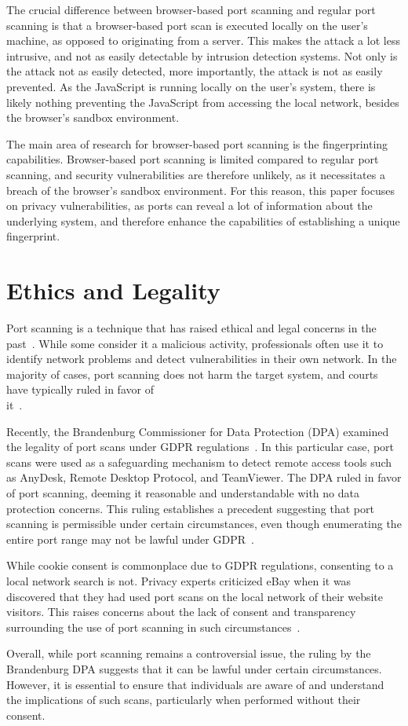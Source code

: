 The crucial difference between browser-based port scanning and regular port scanning is that a browser-based port scan is executed locally on the user's machine, as opposed to originating from a server. 
This makes the attack a lot less intrusive, and not as easily detectable by intrusion detection systems. 
Not only is the attack not as easily detected, more importantly, the attack is not as easily prevented.
As the JavaScript is running locally on the user's system, there is likely nothing preventing the JavaScript from accessing the local network, besides the browser's sandbox environment.

The main area of research for browser-based port scanning is the fingerprinting capabilities. 
Browser-based port scanning is limited compared to regular port scanning, and security vulnerabilities are therefore unlikely, as it necessitates a breach of the browser's sandbox environment. For this reason, this paper focuses on privacy vulnerabilities, as ports can reveal a lot of information about the underlying system, and therefore enhance the capabilities of establishing a unique fingerprint.


\section{Ethics and Legality}
Port scanning is a technique that has raised ethical and legal concerns in the past~. While some consider it a malicious activity, professionals often use it to identify network problems and detect vulnerabilities in their own network. In the majority of cases, port scanning does not harm the target system, and courts have typically ruled in favor of \\ it~.

Recently, the Brandenburg Commissioner for Data Protection (DPA) examined the legality of port scans under GDPR regulations~. In this particular case, port scans were used as a safeguarding mechanism to detect remote access tools such as AnyDesk, Remote Desktop Protocol, and TeamViewer. The DPA ruled in favor of port scanning, deeming it reasonable and understandable with no data protection concerns. This ruling establishes a precedent suggesting that port scanning is permissible under certain circumstances, even though enumerating the entire port range may not be lawful under GDPR~.

While cookie consent is commonplace due to GDPR regulations, consenting to a local network search is not. Privacy experts criticized eBay when it was discovered that they had used port scans on the local network of their website visitors. This raises concerns about the lack of consent and transparency surrounding the use of port scanning in such circumstances~.

Overall, while port scanning remains a controversial issue, the ruling by the Brandenburg DPA suggests that it can be lawful under certain circumstances. However, it is essential to ensure that individuals are aware of and understand the implications of such scans, particularly when performed without their consent.